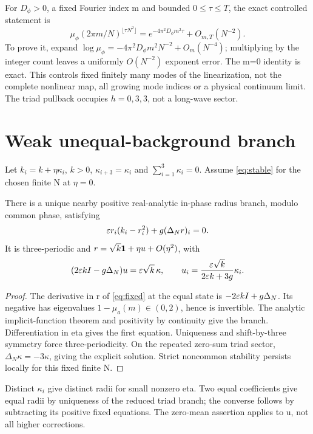 For \(D_\phi>0\), a fixed Fourier index m and bounded \(0\le\tau\le T\), the exact controlled statement is
\begin{equation}
\mu_\phi(2\pi m/N)^{\lfloor\tau N^2\rfloor}
=e^{-4\pi^2D_\phi m^2\tau}+O_{m,T}(N^{-2}).\label{eq:modal}
\end{equation}
To prove it, expand \(\log\mu_\phi=-4\pi^2D_\phi m^2N^{-2}+O_m(N^{-4})\); multiplying by the integer count leaves a uniformly \(O(N^{-2})\) exponent error. The m=0 identity is exact. This controls fixed finitely many modes of the linearization, not the complete nonlinear map, all growing mode indices or a physical continuum limit. The triad pullback occupies \(h=0,3,3\), not a long-wave sector. 

\section{Weak unequal-background branch}\label{sec:unequal}

Let \(k_i=k+\eta\kappa_i\), \(k>0\), \(\kappa_{i+3}=\kappa_i\) and \(\sum_{i=1}^3\kappa_i=0\). Assume \eqref{eq:stable} for the chosen finite N at \(\eta=0\).
\begin{theorem}\label{thm:branch}
There is a unique nearby positive real-analytic in-phase radius branch, modulo common phase, satisfying
\begin{equation}
\varepsilon r_i(k_i-r_i^2)+g(\Delta_Nr)_i=0.\label{eq:fixed}
\end{equation}
It is three-periodic and \(r=\sqrt{k}\mathbf1+\eta u+O(\eta^2)\), with
\begin{equation}
(2\varepsilon kI-g\Delta_N)u=\varepsilon\sqrt{k}\,\kappa,\qquad
u_i=\frac{\varepsilon\sqrt{k}}{2\varepsilon k+3g}\kappa_i.\label{eq:screen}
\end{equation}
\end{theorem}
\begin{proof}
The derivative in r of \eqref{eq:fixed} at the equal state is \(-2\varepsilon kI+g\Delta_N\). Its negative has eigenvalues \(1-\mu_a(m)\in(0,2)\), hence is invertible. The analytic implicit-function theorem and positivity by continuity give the branch. Differentiation in eta gives the first equation. Uniqueness and shift-by-three symmetry force three-periodicity. On the repeated zero-sum triad sector, \(\Delta_N\kappa=-3\kappa\), giving the explicit solution. Strict noncommon stability persists locally for this fixed finite N.
\end{proof}
Distinct \(\kappa_i\) give distinct radii for small nonzero eta. Two equal coefficients give equal radii by uniqueness of the reduced triad branch; the converse follows by subtracting its positive fixed equations. The zero-mean assertion applies to u, not all higher corrections.

